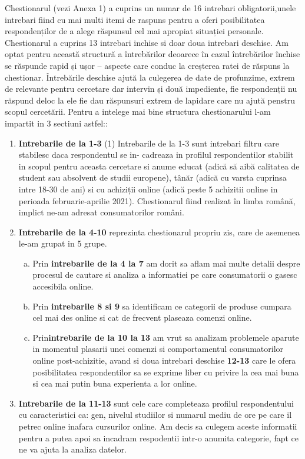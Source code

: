 \documentclass[a4paper, 12pt]{article}
\begin{document}
		\quad Chestionarul (vezi Anexa 1) a cuprins un numar de 16 intrebari obligatorii,unele intrebari fiind cu mai multi itemi de raspuns pentru a oferi posibilitatea respondenților de a alege răspunsul cel mai apropiat situației personale. Chestionarul a cuprins 13 intrebari inchise si doar doua intrebari deschise. Am optat pentru această structură a întrebărilor deoarece în cazul întrebărilor închise se răspunde rapid și ușor – aspecte care conduc la creșterea ratei de răspuns la chestionar. Întrebările deschise  ajută la culegerea de date de profunzime, extrem de relevante pentru cercetare dar intervin și două impediente, fie respondenții nu răspund deloc la ele fie dau răspunsuri extrem de lapidare care nu ajută penstru scopul cercetării. Pentru a intelege mai bine structura chestionarului l-am impartit in 3 sectiuni astfel::
		\begin{enumerate}[(1)]
			\item\textbf{Intrebarile de la 1-3} (1)	Intrebarile de la 1-3 sunt intrebari filtru care stabilesc daca respondentul se in- cadreaza in profilul respondentilor stabilit in scopul pentru aceasta cercetare si anume educat (adică să aibă calitatea de student sau absolvent de studii europene), tânăr (adică cu varsta cuprinsa intre 18-30 de ani) si cu achiziții online (adică peste 5 achizitii online in perioada februarie-aprilie 2021). Chestionarul fiind realizat în limba română, implict ne-am adresat consumatorilor români. 
			\item\textbf{Intrebarile de la 4-10} reprezinta chestionarul propriu zis, care de asemenea le-am grupat in 5 grupe.
		\begin{enumerate}[(a)]
			\item Prin \textbf{intrebarile de la 4 la 7} am dorit sa aflam mai multe detalii despre procesul de cautare si analiza a informatiei pe care consumatorii o gasesc accesibila online.
			\item Prin \textbf{intrebarile 8 si 9} sa identificam ce categorii de produse cumpara cel mai des online si cat de frecvent plaseaza comenzi online.
			\item Prin\textbf{intrebarile de la 10 la 13} am vrut sa analizam problemele aparute in momentul plasarii unei comenzi si comportamentul consumatorilor online post-achizitie, avand si doua intrebari deschise \textbf {12-13} care le ofera posibilitatea respondentilor sa se exprime liber cu privire la cea mai buna si cea mai putin buna experienta a lor online.
		\end{enumerate}
		\item\textbf{Intrebarile de la 11-13} sunt cele care completeaza profilul respondentului cu caracteristici ca: gen, nivelul studiilor si numarul mediu de ore pe care il petrec online inafara cursurilor online. Am decis sa culegem aceste informatii pentru a putea apoi sa incadram respodentii intr-o anumita categorie, fapt ce ne va ajuta la analiza datelor.
		\end{enumerate}
	
\end{document}
